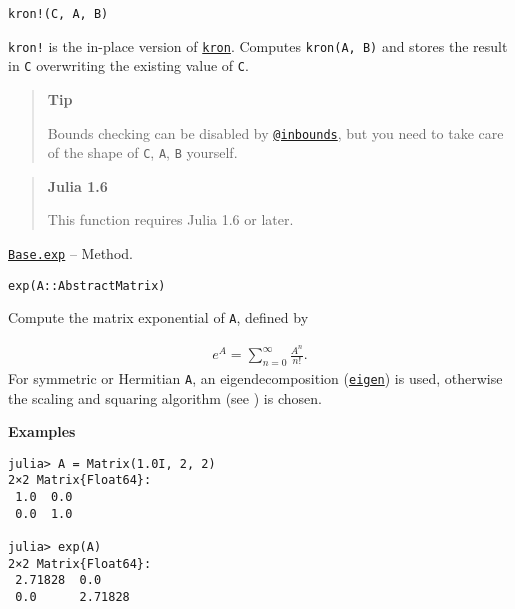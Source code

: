 \begin{adjustwidth}{2em}{0pt}


\begin{verbatim}
kron!(C, A, B)
\end{verbatim}

\texttt{kron!} is the in-place version of \hyperlink{14153417388267953812}{\texttt{kron}}. Computes \texttt{kron(A, B)} and stores the result in \texttt{C} overwriting the existing value of \texttt{C}.

\begin{quote}
\textbf{Tip}

Bounds checking can be disabled by \hyperlink{9619263577270933060}{\texttt{@inbounds}}, but you need to take care of the shape of \texttt{C}, \texttt{A}, \texttt{B} yourself.

\end{quote}
\begin{quote}
\textbf{Julia 1.6}

This function requires Julia 1.6 or later.

\end{quote}


\end{adjustwidth}
\hypertarget{5960416741298255752}{}
\hyperlink{5960416741298255752}{\texttt{Base.exp}}  -- {Method.}

\begin{adjustwidth}{2em}{0pt}


\begin{verbatim}
exp(A::AbstractMatrix)
\end{verbatim}

Compute the matrix exponential of \texttt{A}, defined by

\begin{equation*}
\begin{split}e^A = \sum_{n=0}^{\infty} \frac{A^n}{n!}.\end{split}\end{equation*}
For symmetric or Hermitian \texttt{A}, an eigendecomposition (\hyperlink{11056016707394839114}{\texttt{eigen}}) is used, otherwise the scaling and squaring algorithm (see \footnotemark[8]) is chosen.

\textbf{Examples}


\begin{verbatim}
julia> A = Matrix(1.0I, 2, 2)
2×2 Matrix{Float64}:
 1.0  0.0
 0.0  1.0

julia> exp(A)
2×2 Matrix{Float64}:
 2.71828  0.0
 0.0      2.71828
\end{verbatim}



\end{adjustwidth}


